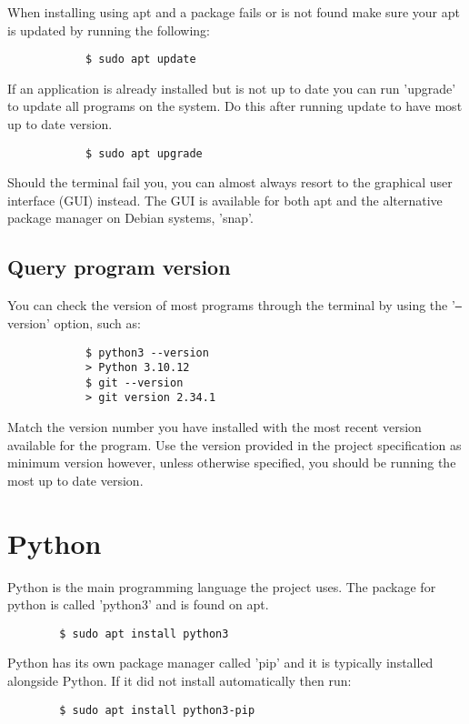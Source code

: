\documentclass{liu_mall_engelska}
\begin{document}
        When installing using apt and a package fails or is not found make sure your apt is updated by running the following:
        \begin{lstlisting}
            $ sudo apt update
        \end{lstlisting}
    
        If an application is already installed but is not up to date you can run 'upgrade' to update all programs on the system. Do this after running update to have most up to date version.
        \begin{lstlisting}
            $ sudo apt upgrade
        \end{lstlisting}

        Should the terminal fail you, you can almost always resort to the graphical user interface (GUI) instead. The GUI is available for both apt and the alternative package manager on Debian systems, 'snap'.

    \subsection{Query program version}
        You can check the version of most programs through the terminal by using the '\texttt{--}version' option, such as:%
        \begin{lstlisting}
            $ python3 --version
            > Python 3.10.12
            $ git --version
            > git version 2.34.1
        \end{lstlisting}

        Match the version number you have installed with the most recent version available for the program. Use the version provided in the project specification as minimum version however, unless otherwise specified, you should be running the most up to date version.%

\newpage
\section{Python}
    Python is the main programming language the project uses.
    The package for python is called 'python3' and is found on apt.
    \begin{lstlisting}
        $ sudo apt install python3
    \end{lstlisting}
    
    Python has its own package manager called 'pip' and it is typically installed alongside Python. If it did not install automatically then run:
    \begin{lstlisting}
        $ sudo apt install python3-pip
    \end{lstlisting}
\end{document}
